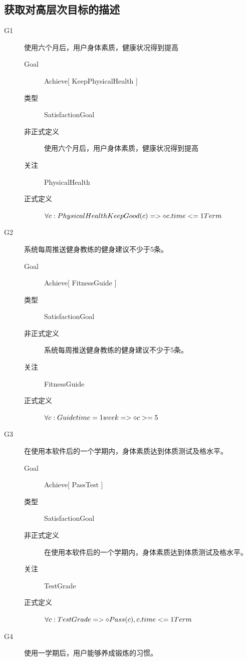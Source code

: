 \documentclass[UTF8]{ctexart}
\begin{document}
\subsection{获取对高层次目标的描述}
\begin{description}
   \item[G1] 使用六个月后，用户身体素质，健康状况得到提高
   \begin{description}
      \item[Goal] Achieve[ KeepPhysicalHealth ]
      \item[类型] SatisfactionGoal
      \item[非正式定义] 使用六个月后，用户身体素质，健康状况得到提高
      \item[关注] PhysicalHealth
      \item[正式定义] $\forall c:PhysicalHealth\\ KeepGood(c)\\ =>\diamond c.time<=1Term$
   \end{description}
   \item[G2] 系统每周推送健身教练的健身建议不少于5条。
   \begin{description}
      \item[Goal] Achieve[ FitnessGuide ]
      \item[类型] SatisfactionGoal
      \item[非正式定义] 系统每周推送健身教练的健身建议不少于5条。
      \item[关注] FitnessGuide
      \item[正式定义] $\forall c:Guide\\ time=1week\\ =>\diamond c>=5$
   \end{description}
   \item[G3] 在使用本软件后的一个学期内，身体素质达到体质测试及格水平。
   \begin{description}
      \item[Goal] Achieve[ PassTest ]
      \item[类型] SatisfactionGoal
      \item[非正式定义] 在使用本软件后的一个学期内，身体素质达到体质测试及格水平。
      \item[关注] TestGrade
      \item[正式定义] $\forall c:TestGrade\\ =>\diamond Pass(c),c.time<=1Term$
   \end{description}
   \item[G4] 使用一学期后，用户能够养成锻炼的习惯。

\end{description}
\end{document}

